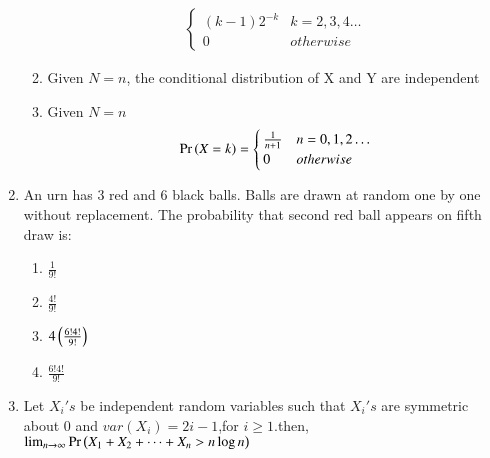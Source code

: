 \begin{enumerate}[label=\thesection.\arabic*.,ref=\thesection.\theenumi]
\begin{enumerate}
{\begin{align}
\begin{cases}
            (k-1)2^{-k} & k=2,3,4 \ldots
            \\
            0 & otherwise
        \end{cases}
    \end{align}
    }
    \item Given $N = n$, the conditional distribution of X and Y are independent
    \item Given $N = n$
     \begin{align}
        \Pr\left(X = k\right) =
        \begin{cases}
            \frac{1}{n+1} & n=0,1,2 \ldots
            \\
            0 & otherwise
        \end{cases}
    \end{align}
\end{enumerate}
%
\item An urn has 3 red and 6 black balls. Balls are drawn at random one by one without replacement. The probability that second red ball appears on fifth draw is: \\
\begin{enumerate}
    \item $\frac{1}{9!}$
    \newline
    \item $\frac{4!}{9!}$
    \newline
    \item $4\left(\frac{6!4!}{9!}\right)$
    \newline
    \item $\frac{6!4!}{9!}$
\end{enumerate}
%
%
\solution

%
\item Let $X_i 's$ be independent random variables such that $X_i 's$ are symmetric about 0 and $var(X_i)=2i - 1$,for $i\geq 1$.then,
$\lim_{n \to \infty}\Pr\left(X_1 +X_2 + \dots + X_n > n\log{n}\right)$
\begin{enumerate}
\end{enumerate}
%
\solution


\end{enumerate}

